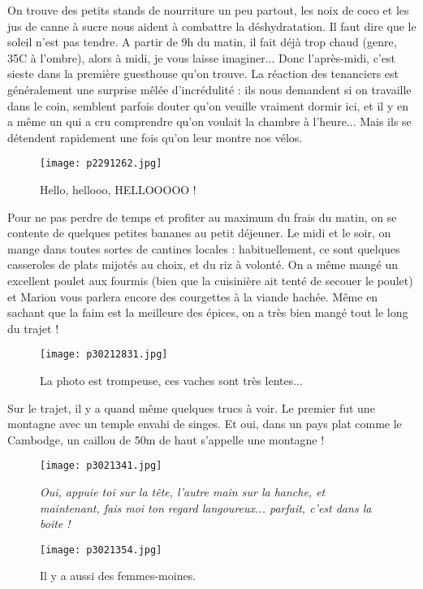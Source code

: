 \documentclass{book}
\begin{document}
On trouve des petits stands de nourriture un peu partout, les noix de coco et les jus de canne à sucre nous aident à combattre la déshydratation. Il faut dire que le soleil n'est pas tendre. A partir de 9h du matin, il fait déjà trop chaud (genre, 35\textdegree C à l'ombre), alors à midi, je vous laisse imaginer... Donc l'après-midi, c'est sieste dans la première guesthouse qu'on trouve. La réaction des tenanciers  est généralement une surprise mêlée d'incrédulité : ils nous demandent si on travaille dans le coin, semblent parfois douter qu'on veuille vraiment dormir ici, et il y en a même un qui a cru comprendre qu'on voulait la chambre à l'heure... Mais ils se détendent rapidement une fois qu'on leur montre nos vélos.


\begin{figure}[h]
\centering
\texttt{[image: p2291262.jpg]}
\caption*{Hello, hellooo, HELLOOOOO !}
\end{figure}

Pour ne pas perdre de temps et profiter au maximum du frais du matin, on se contente de quelques petites bananes au petit déjeuner. Le midi et le soir, on mange dans toutes sortes de cantines locales : habituellement, ce sont quelques casseroles de plats mijotés au choix, et du riz à volonté. On a même mangé un excellent poulet aux fourmis (bien que la cuisinière ait tenté de secouer le poulet) et Marion vous parlera encore des courgettes à la viande hachée. Même en sachant que la faim est la meilleure des épices, on a très bien mangé tout le long du trajet !


\begin{figure}[h]
\centering
\texttt{[image: p30212831.jpg]}
\caption*{La photo est trompeuse, ces vaches sont très lentes...}
\end{figure}

Sur le trajet, il y a quand même quelques trucs à voir. Le premier fut une montagne avec un temple envahi de singes. Et oui, dans un pays plat comme le Cambodge, un caillou de 50m de haut s'appelle une montagne !


\begin{figure}[h]
\centering
\texttt{[image: p3021341.jpg]}
\caption*{\emph{Oui, appuie toi sur la tête, l'autre main sur la hanche, et maintenant, fais moi ton regard langoureux... parfait, c'est dans la boite !}}
\end{figure}


\begin{figure}[h]
\centering
\texttt{[image: p3021354.jpg]}
\caption*{Il y a aussi des femmes-moines.}
\end{figure}
\end{document}
